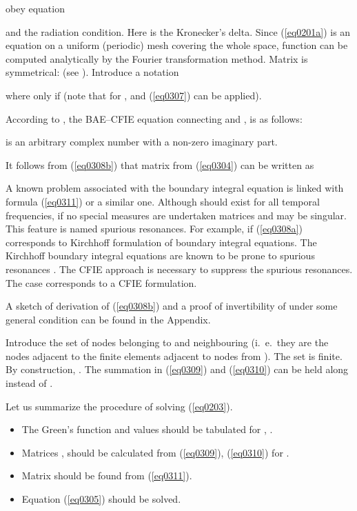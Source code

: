 \documentclass[12pt]{article}
\begin{document}
obey
equation

and the radiation condition. Here  is the Kronecker's delta.
Since (\ref{eq0201a}) is an equation on a uniform (periodic) mesh covering the whole space, function  can be computed analytically by the Fourier transformation method. Matrix  is symmetrical:
 (see \cite{poblet-PVS:2015}).
Introduce a notation

where  only if  (note that for 
, and (\ref{eq0307}) can be applied).

According to \cite{poblet-PVS:2015}, the BAE--CFIE equation connecting  and ,  is as
follows:



 is an arbitrary complex number with a non-zero imaginary part.

It follows from (\ref{eq0308b}) that matrix  from (\ref{eq0304}) can be written as


A known problem associated with the boundary integral equation is linked with formula (\ref{eq0311}) or a similar one. Although  should exist for all temporal frequencies, if no special measures are undertaken
matrices  and  may be singular. This feature is named spurious resonances. For example,
if  (\ref{eq0308a}) corresponds to Kirchhoff formulation of boundary integral equations.
The Kirchhoff boundary integral equations are known to be prone to spurious resonances \cite{Schenck:41,Benthien-Schenck:1997,chien:1990}.
The CFIE approach is necessary to suppress the spurious resonances. The case 
corresponds to a CFIE formulation.

A sketch of derivation of (\ref{eq0308b}) and a proof of invertibility of  under some general condition
can be found in the Appendix.

Introduce the set of nodes  belonging to  and neighbouring 
(i.~e.\ they are the nodes adjacent to the finite elements adjacent to nodes from ).
The set  is finite. By construction, . The summation
in (\ref{eq0309}) and (\ref{eq0310}) can be held along  instead of .

Let us summarize the procedure of solving (\ref{eq0203}).
\begin{itemize}
\item
The Green's function  and values  should be tabulated for
, .
\item
Matrices ,  should be calculated from (\ref{eq0309}), (\ref{eq0310}) for .
\item
Matrix  should be found from (\ref{eq0311}).
\item
Equation (\ref{eq0305}) should be solved.
\end{itemize}
\end{document}
